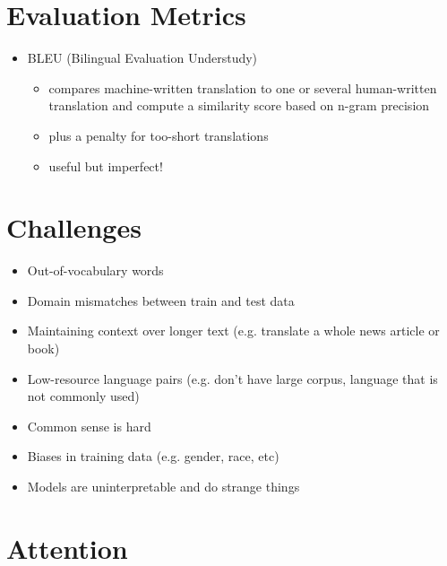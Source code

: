 \documentclass[../main.tex]{subfiles}
\begin{document}
\section{Evaluation Metrics}
\begin{itemize}
  \item BLEU (Bilingual Evaluation Understudy)
  \begin{itemize}
    \item compares machine-written translation to one or several human-written translation and compute a similarity score based on n-gram precision
    \item plus a penalty for too-short translations
    \item useful but imperfect!
  \end{itemize}
\end{itemize}

\section{Challenges}
\begin{itemize}
  \item Out-of-vocabulary words
  \item Domain mismatches between train and test data
  \item Maintaining context over longer text (e.g. translate a whole news article or book)
  \item Low-resource language pairs (e.g. don't have large corpus, language that is not commonly used)
  \item Common sense is hard
  \item Biases in training data (e.g. gender, race, etc)
  \item Models are uninterpretable and do strange things
\end{itemize}



\section{Attention}
\end{document}
